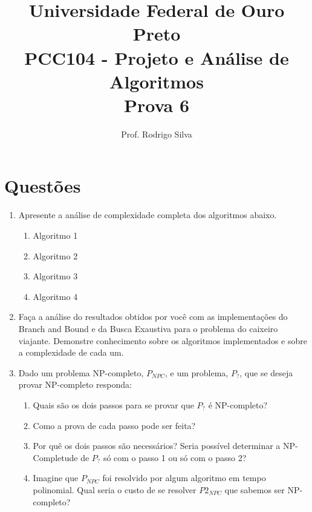 \documentclass{article}
\title{\vspace{-2 cm}Universidade Federal de Ouro Preto \\ PCC104 - Projeto e Análise de Algoritmos \\ Prova 6}
\author{Prof. Rodrigo Silva}
\begin{document}
\maketitle

\section*{Questões}

\begin{enumerate}

    \item Apresente a análise de complexidade completa dos algoritmos abaixo. 
    
    \begin{enumerate}
        \item Algoritmo 1
        \begin{figure}[!ht]
            
        \end{figure}

        \item Algoritmo 2
        \begin{figure}[!ht]
            
        \end{figure}

        \item Algoritmo 3
        \begin{figure}[!ht]
            
        \end{figure}

        \item Algoritmo 4
        \begin{figure}[!ht]
            
        \end{figure}
    \end{enumerate}

    \item Faça a análise do resultados obtidos por você com as implementações do Branch and Bound e da Busca Exaustiva para o problema do caixeiro viajante. Demonstre conhecimento sobre os algoritmos implementados e sobre a complexidade de cada um.
    
    \item Dado um problema NP-completo, $P_{NPC}$, e um problema, ${P_{?}}$, que se deseja provar NP-completo responda:
    \begin{enumerate}
        \item Quais são os dois passos para se provar que $P_{?}$ é NP-completo? 
        \item Como a prova de cada passo pode ser feita?
        \item Por quê os dois passos são necessários? Seria possível determinar a NP-Completude de $P_{?}$ só com o passo 1 ou só com o passo 2?
        \item Imagine que $P_{NPC}$ foi resolvido por algum algoritmo em tempo polinomial. Qual seria o custo de se resolver $P2_{NPC}$ que sabemos ser NP-completo? 
    \end{enumerate} 
    


    
\end{enumerate}



%
%
\end{document}
